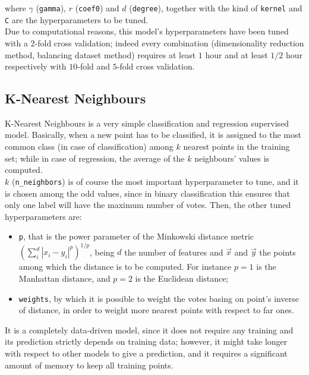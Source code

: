 \documentclass[letterpaper]{article}
\begin{document}
	where $\gamma$ (\texttt{gamma}), $r$ (\texttt{coef0}) and $d$ (\texttt{degree}), together with the kind of \texttt{kernel} and \texttt{C} are the hyperparameters to be tuned.\\
	Due to computational reasons, this model's hyperparameters have been tuned with a $2$-fold cross validation; indeed every combination (dimensionality reduction method, balancing dataset method) requires at least $1$ hour and at least $1/2$ hour respectively with $10$-fold and $5$-fold cross validation.
	
	\subsection{K-Nearest Neighbours}
	K-Nearest Neighbours is a very simple classification and regression supervised model. Basically, when a new point has to be classified, it is assigned to the most common class (in case of classification) among $k$ nearest points in the training set; while in case of regression, the average of the $k$ neighbours' values is computed. \\ 
	$k$ (\texttt{n\_neighbors}) is of course the most important hyperparameter to tune, and it is chosen among the odd values, since in binary classification this ensures that only one label will have the maximum number of votes. Then, the other tuned hyperparameters are:
	\begin{itemize}
		\item \texttt{p}, that is the power parameter of the Minkowski distance metric $(\sum_{i}^{d}| x_i- y_i|^p)^{1/p}$, being $d$ the number of features and $\vec{x}$ and $\vec{y}$ the points among which the distance is to be computed. For instance $p=1$ is the Manhattan distance, and $p=2$ is the Euclidean distance;
		\item \texttt{weights}, by which it is possible to weight the votes basing on point's inverse of distance, in order to weight more nearest points with respect to far ones.
	\end{itemize}
	It is a completely data-driven model, since it does not require any training and its prediction strictly depends on training data; however, it might take longer with respect to other models to give a prediction, and it requires a significant amount of memory to keep all training points.
\end{document}
